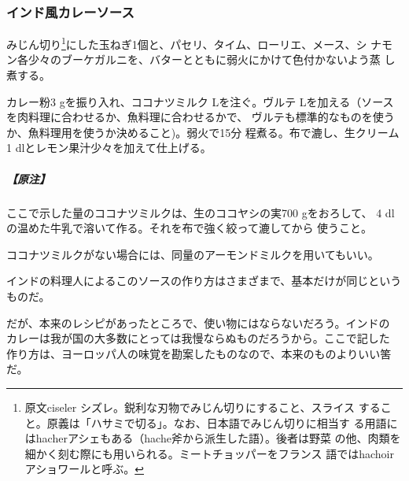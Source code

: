 \begin{recette}
\maeaki

\hypertarget{sauce-currie-indienne}{%
\subsubsection{インド風カレーソース}\label{sauce-currie-indienne}}



みじん切り\footnote{原文ciseler
  シズレ。鋭利な刃物でみじん切りにすること、スライス
  すること。原義は「ハサミで切る」。なお、日本語でみじん切りに相当す
  る用語にはhacherアシェもある（hache斧から派生した語）。後者は野菜
  の他、肉類を細かく刻む際にも用いられる。ミートチョッパーをフランス
  語ではhachoirアショワールと呼ぶ。}にした玉ねぎ1個と、パセリ、タイム、ローリエ、メース、シ
ナモン各少々のブーケガルニを、バターとともに弱火にかけて色付かないよう蒸
し煮する。

カレー粉3 gを振り入れ、ココナツミルク\undemi{} Lを注ぐ。ヴルテ \undemi{}
Lを加える（ソースを肉料理に合わせるか、魚料理に合わせるかで、
ヴルテも標準的なものを使うか、魚料理用を使うか決めること)。弱火で15分
程煮る。布で漉し、生クリーム1 dlとレモン果汁少々を加えて仕上げる。

\hypertarget{nota-sauce-currie-indienne}{%
\subparagraph{【原注】}\label{nota-sauce-currie-indienne}}

ここで示した量のココナツミルクは、生のココヤシの実700 gをおろして、
4\undemi{} dlの温めた牛乳で溶いて作る。それを布で強く絞って漉してから
使うこと。

ココナツミルクがない場合には、同量のアーモンドミルクを用いてもいい。

インドの料理人によるこのソースの作り方はさまざまで、基本だけが同じというものだ。

だが、本来のレシピがあったところで、使い物にはならないだろう。インドの
カレーは我が国の大多数にとっては我慢ならぬものだろうから。ここで記した
作り方は、ヨーロッパ人の味覚を勘案したものなので、本来のものよりいい筈
だ。

\maeaki


\end{recette}

